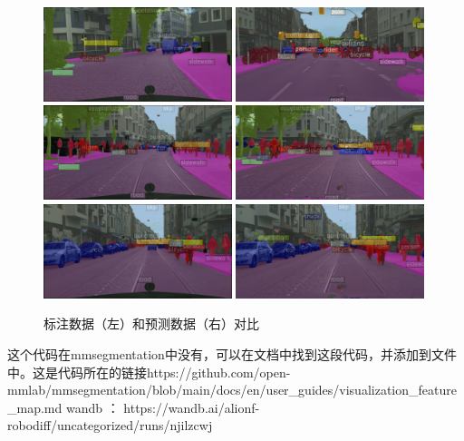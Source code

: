 \documentclass[12pt]{ctexart}
\begin{document}
\begin{figure}[H]  %
    \centering        %
    \includegraphics[width=0.49\textwidth]{result/plot/mask1.png}
    \includegraphics[width=0.49\textwidth]{result/plot/predict_deeplabv3plus.jpg}
    \includegraphics[width=0.49\textwidth]{result/plot/mask2.png}
    \includegraphics[width=0.49\textwidth]{result/plot/predict_1_deeplabv3plus.jpg}
    \includegraphics[width=0.49\textwidth]{result/plot/mask3.png}
    \includegraphics[width=0.49\textwidth]{result/plot/predict_2_deeplabv3plus.jpg}
    \caption{标注数据（左）和预测数据（右）对比}
    \label{fig:compare_deeplabv3plus}
\end{figure}
这个代码在mmsegmentation中没有，可以在文档中找到这段代码，并添加到文件中。这是代码所在的链接https://github.com/open-mmlab/mmsegmentation/blob/main/docs/en/user\_guides/visualization\_feature\_map.md 
wandb ： https://wandb.ai/alionf-robodiff/uncategorized/runs/njilzcwj
\end{document}
